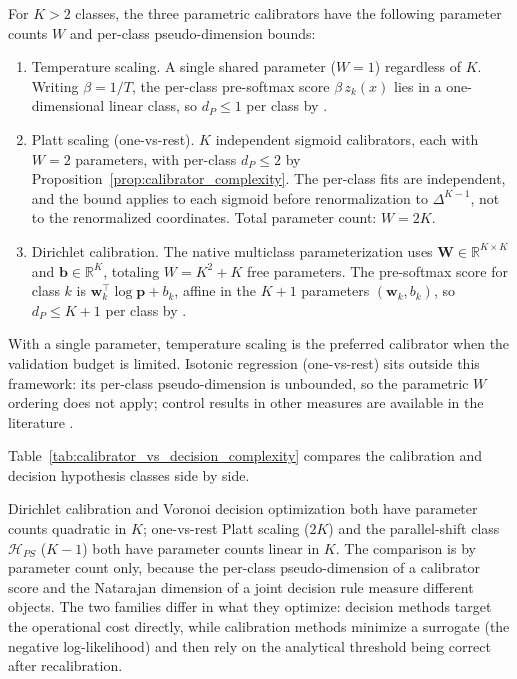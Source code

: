 \begin{proposition}\label{rem:multiclass_calibration}
    For $K > 2$ classes, the three parametric calibrators have the following parameter counts $W$ and per-class pseudo-dimension bounds:
    \begin{enumerate}
        \item Temperature scaling. A single shared parameter ($W = 1$) regardless of $K$. Writing $\beta = 1/T$, the per-class pre-softmax score $\beta\, z_k(x)$ lies in a one-dimensional linear class, so $d_P \leq 1$ per class by \citet[Theorem~11.4]{anthony1999neural}.
        \item Platt scaling (one-vs-rest). $K$ independent sigmoid calibrators, each with $W = 2$ parameters, with per-class $d_P \leq 2$ by Proposition~\ref{prop:calibrator_complexity}. The per-class fits are independent, and the bound applies to each sigmoid before renormalization to $\Delta^{K-1}$, not to the renormalized coordinates. Total parameter count: $W = 2K$.
        \item Dirichlet calibration. The native multiclass parameterization uses $\mathbf{W} \in \mathbb{R}^{K \times K}$ and $\mathbf{b} \in \mathbb{R}^K$, totaling $W = K^2 + K$ free parameters. The pre-softmax score for class $k$ is $\mathbf{w}_k^\top \log\mathbf{p} + b_k$, affine in the $K+1$ parameters $(\mathbf{w}_k, b_k)$, so $d_P \leq K + 1$ per class by \citet[Theorem~11.4]{anthony1999neural}.
    \end{enumerate}
\end{proposition}

With a single parameter, temperature scaling is the preferred calibrator when the validation budget is limited. Isotonic regression (one-vs-rest) sits outside this framework: its per-class pseudo-dimension is unbounded, so the parametric $W$ ordering does not apply; control results in other measures are available in the literature \citep{meyer2000degrees}.

Table~\ref{tab:calibrator_vs_decision_complexity} compares the calibration and decision hypothesis classes side by side.



Dirichlet calibration and Voronoi decision optimization both have parameter counts quadratic in $K$; one-vs-rest Platt scaling ($2K$) and the parallel-shift class $\mathcal{H}_{PS}$ ($K-1$) both have parameter counts linear in $K$. The comparison is by parameter count only, because the per-class pseudo-dimension of a calibrator score and the Natarajan dimension of a joint decision rule measure different objects. The two families differ in what they optimize: decision methods target the operational cost directly, while calibration methods minimize a surrogate (the negative log-likelihood) and then rely on the analytical threshold being correct after recalibration.
